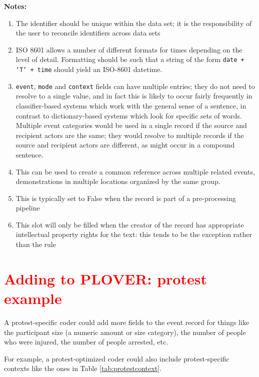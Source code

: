 \documentclass[11pt]{report}
\newcommand{\andy}[1]{\textcolor{red}{#1}}
\begin{document}
\noindent \textbf{Notes:}
\begin{enumerate}
\item The identifier should be unique within the data set; it is the responsibility of the user to reconcile identifiers across data sets
\item ISO 8601 allows a number of different formats for times depending on the level of detail. Formatting should be such that a string of the form \texttt{date + `T' + time} should yield an ISO-8601 datetime.
\item  \texttt{event}, \texttt{mode} and \texttt{context} fields can have multiple entries; they do not need to resolve to a single value, and in fact this is likely to occur fairly frequently in classifier-based systems which work with the general sense of a sentence, in contrast to dictionary-based systems which look for specific sets of words. Multiple event categories would be used in a single record if the source and recipient actors are the same; they would resolve to multiple records if the source and recipient actors are different, as might occur in a compound sentence.
\item  This can be used to create a common reference across multiple related events, demonstrations in multiple locations organized by the same group.
\item This is typically set to False when the record is part of a pre-processing pipeline
\item This slot will only be filled when the creator of the record has appropriate intellectual property rights for the text: this tends to be the exception rather than the rule
\end{enumerate}


\section{\andy{Adding to PLOVER: protest example}} \label{sec:adding_to_plover}



A protest-specific coder could add more fields to the event record for things like the participant size (a numeric amount or size category), the number of people who were injured, the number of people arrested, etc.

For example, a protest-optimized coder could also include protest-specific contexts like the ones in Table \ref{tab:protestcontext}.
\end{document}
